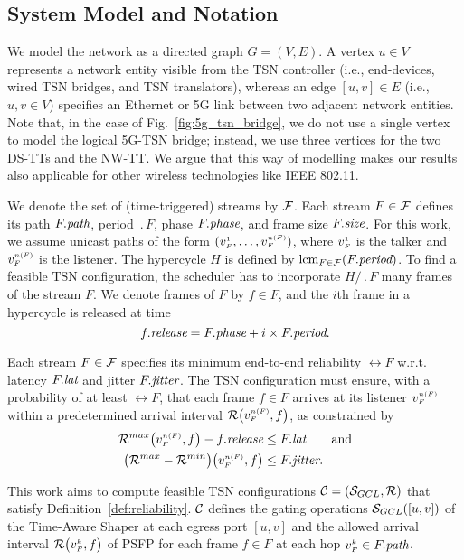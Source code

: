 \subsection{System Model and Notation}
We model the network as a directed graph $G = (V, E)$.
A vertex $u \in V$ represents a network entity visible from the TSN controller (i.e., end-devices, wired TSN bridges, and TSN translators), whereas an edge $[u,v] \in E$ (i.e., $u,v \in V$) specifies an Ethernet or 5G link between two adjacent network entities.
Note that, in the case of Fig.~\ref{fig:5g_tsn_bridge}, we do not use a single vertex to model the logical 5G-TSN bridge;
instead, we use three vertices for the two DS-TTs and the NW-TT.
We argue that this way of modelling makes our results also applicable for other wireless technologies like IEEE 802.11.

We denote the set of (time-triggered) streams by $\TT$.
Each stream $F \in \TT$ defines its path $\path{F}$, period $\period{F}$, phase $\phase{F}$, and frame size $\size{F}$.
For this work, we assume unicast paths of the form $(\v{1}{F}, \ldots, \vl{F})$, where $\v{1}{F}$ is the talker and $\vl{F}$ is the listener. 
The hypercycle $H$ is defined by $\text{lcm}_{F \in \TT}(\period{F})$.
To find a feasible TSN configuration, the scheduler has to incorporate $H / \period{F}$ many frames of the stream $F$.
We denote frames of $F$ by $f \in F$, and the $i$th frame in a hypercycle is released at time
\begin{equation*}
  \release{f} = \phase{F} + i \times \period{F}.
\end{equation*}

\begin{definition} \label{def:reliability}
  Each stream $F \in \TT$ specifies its minimum end-to-end reliability $\rel{F}$ w.r.t. latency $\ete{F}$ and jitter $\jitter{F}$.
The TSN configuration must ensure, with a probability of at least $\rel{F}$, that each frame $f \in F$ arrives at its listener $\vl{F}$ within a predetermined arrival interval $\R{\vl{F}, f}$, as constrained by
\begin{align}
  \Rmax{\vl{F}, f} - \release{f} &\leq \ete{F} \qquad \text{and} \label{eq:latency} \\
  \sub{\Rmax}{\Rmin}{\vl{F}, f} &\leq \jitter{F}. \label{eq:jitter}
\end{align}
\end{definition}

This work aims to compute feasible TSN configurations $\Conf = (\GCL, \R{})$ that satisfy Definition~\ref{def:reliability}.
$\Conf$ defines the gating operations $\GCL([u,v])$ of the Time-Aware Shaper at each egress port $[u,v]$ and the allowed arrival interval $\R{\v{k}{F}, f}$ of PSFP for each frame $f \in F$ at each hop $\v{k}{F} \in \path{F}$.

